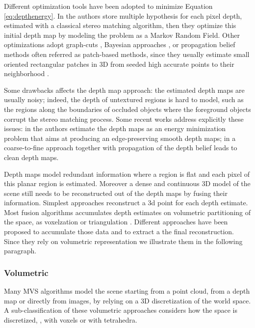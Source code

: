 Different optimization tools have been adopted to minimize Equation \eqref{eq:depthenergy}. 
In \cite{campbell2008using} the authors store multiple hypothesis for each pixel depth, estimated with a classical stereo matching algorithm, then they optimize this initial depth map by modeling the problem as a Markov Random Field. Other optimizations adopt graph-cuts \cite{kolmogorov2002multi}, Bayesian approaches \cite{strecha2006combined,gargallo2005bayesian}, or propagation belief methods often referred as patch-based methods, since they usually estimate small oriented rectangular patches in 3D from seeded high accurate points to their neighborhood \cite{fu10,goesele2007multi,Tola12,bleyer2011patchmatch,heise2013pm}.




Some drawbacks affects the depth map approach: the estimated depth maps are usually noisy; indeed, the depth of untextured regions is hard to model, such as the regions along the boundaries of occluded objects where the foreground objects corrupt the stereo matching process.
Some recent works address explicitly these issues:
in \cite{semerjian2014new} the authors estimate the depth maps as an energy minimization problem that aims at producing an edge-preserving smooth depth maps; in \cite{wei2014multi} a coarse-to-fine approach together with propagation of the depth belief leads to clean depth maps.

Depth maps model redundant information where a region is flat and each pixel of this planar region is estimated. 
Moreover a dense and continuous 3D model of the scene still needs to be reconstructed out of the depth maps by fusing their information.
Simplest approaches reconstruct a 3d point for each depth estimate.
Most fusion algorithms accumulates depth estimates on volumetric partitioning of the space, as voxelzation \cite{curless1996volumetric} or triangulation   \cite{bradley2008accurate,labatut2007efficient,vu_et_al_2012}. 
Different approaches have been proposed to accumulate those data and to extract a the final reconstruction. Since they rely on volumetric representation we illustrate them in the following paragraph.

\subsubsection{Volumetric}
Many MVS algorithms model the scene starting from a point cloud, from a depth map or directly from images, by relying on a 3D discretization of the world space.
A sub-classification of these volumetric approaches considers how the space is discretized, \ie, with voxels or with tetrahedra.


